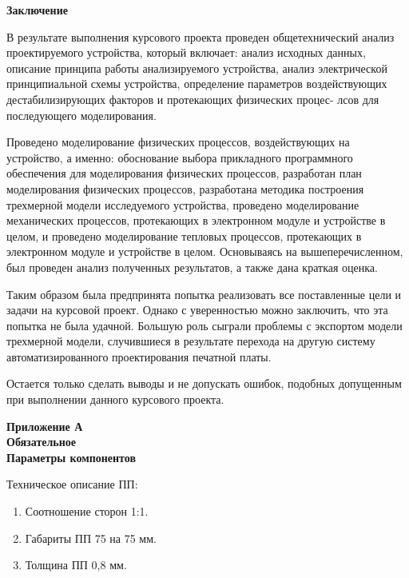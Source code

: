 \begin{center}
\textbf{Заключение}
\end{center}

В результате выполнения курсового проекта проведен общетехнический
анализ проектируемого устройства, который включает: анализ исходных данных, описание принципа работы анализируемого устройства, анализ электрической принципиальной схемы устройства, определение параметров воздействующих дестабилизирующих факторов и протекающих физических процес-
лсов для последующего моделирования.

Проведено моделирование физических процессов, воздействующих на
устройство, а именно: обоснование выбора прикладного программного обеспечения для моделирования физических процессов, разработан план моделирования физических процессов, разработана методика построения трехмерной модели исследуемого устройства, проведено моделирование механических
процессов, протекающих в электронном модуле и устройстве в целом, и проведено моделирование тепловых процессов, протекающих в электронном модуле и устройстве в целом.
Основываясь на вышеперечисленном, был проведен анализ полученных
результатов, а также дана краткая оценка.

Таким образом была предпринята попытка реализовать все поставленные цели и задачи на курсовой проект. Однако с уверенностью можно заключить, что эта попытка не была удачной. Большую роль сыграли проблемы с экспортом модели трехмерной модели, случившиеся в результате перехода на другую систему автоматизированного проектирования печатной платы.

Остается только сделать выводы и не допускать ошибок, подобных допущенным при выполнении данного курсового проекта.
  \newpage



\renewcommand{\refname}{\textbf{Cписок использованных источников}}
\printbibliography

\newpage
\begin{center}
\textbf{Приложение А}\\
\textbf{Обязательное}\\
\textbf{Параметры компонентов}
\end{center}

Техническое описание ПП:
\begin{enumerate}[label={\arabic*.}]
\item Соотношение сторон 1:1.
\item Габариты ПП 75 на 75 мм.
\item Толщина ПП 0,8 мм.
\end{enumerate}

